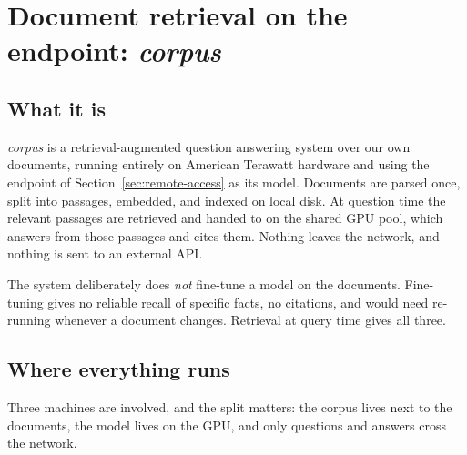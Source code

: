 \section{Document retrieval on the endpoint: \textit{corpus}}
\label{sec:corpus}

\subsection{What it is}
\textit{corpus} is a retrieval-augmented question answering system over our own
documents, running entirely on American Terawatt hardware and using the
endpoint of Section~\ref{sec:remote-access} as its model. Documents are parsed
once, split into passages, embedded, and indexed on local disk. At question
time the relevant passages are retrieved and handed to  on
the shared GPU pool, which answers from those passages and cites them. Nothing
leaves the network, and nothing is sent to an external API.

The system deliberately does \emph{not} fine-tune a model on the documents.
Fine-tuning gives no reliable recall of specific facts, no citations, and would
need re-running whenever a document changes. Retrieval at query time gives all
three.

\subsection{Where everything runs}
Three machines are involved, and the split matters: the corpus lives next to
the documents, the model lives on the GPU, and only questions and answers cross
the network.


